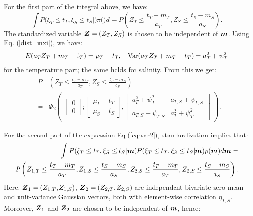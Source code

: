 \documentclass[aoas]{imsart}
\begin{document}
For the first part of the integral above, we have:
\begin{equation}
\label{part1:phi2}
 \int P(\xi_T \leq t_T, \xi_S \leq t_S|\bm) \pi(\bm) d\bm= 
P \left( Z_{T} \leq \frac{t_T-m_{T}}{a_{T}}, 
Z_{S} \leq \frac{t_S-m_{S}}{a_{S}} \right). \nonumber
\end{equation}
The standardized variable ${\boldsymbol Z}=(Z_{T},Z_{S})$ is chosen to be independent of ${\boldsymbol m}$. Using Eq. (\ref{dist_mxi}), we have:
\begin{equation}
    E(a_{T} Z_{T}+m_{T}-t_T) = \mu_{T}-t_T, \hspace{3mm}
    \mbox{Var}(a_{T} Z_{T}+m_{T}-t_T) = a^2_T+ \psi^2_{T} 
\end{equation}
for the temperature part; the same holds for salinity. From this we
get:
\begin{eqnarray}\label{two_parts0}
& P & \left( Z_{T} \leq \frac{t_T-m_{T}}{a_{T}}, 
Z_{S} \leq \frac{t_S-m_{S}}{a_{S}} \right) \\
&=& \Phi_2 \begin{pmatrix} 
\begin{bmatrix} 0\\
0
\end{bmatrix};
\begin{bmatrix} \mu_{T}-t_T\\
\mu_{S}-t_S
\end{bmatrix},\begin{bmatrix}
a^2_T+ \psi^2_{T} & a_{T,S}+\psi_{T,S}  \\
a_{T,S}+\psi_{T,S}   & a^2_T+ \psi^2_{T} 
\end{bmatrix}\end{pmatrix} \nonumber.
\end{eqnarray}

For the second part of the expression Eq.(\ref{eq:var2}), standardization
implies that: 
\begin{eqnarray}\label{part1:phi4}
&& \hspace{6mm} \int P(\xi_T \leq t_T, \xi_S \leq t_S|\bm) P(\xi_T \leq t_T, \xi_S \leq t_S|\bm) p(\bm) d\bm =  \\
&P& \hspace{-3mm} \left( Z_{1,T} \leq \frac{t_T-m_{T}}{a_{T}}, 
Z_{1,S} \leq \frac{t_S-m_{S}}{a_{S}},Z_{2,S} \leq \frac{t_T-m_{T}}{a_{T}}, 
Z_{2,S} \leq \frac{t_S-m_{S}}{a_{S}} \right). \nonumber
\end{eqnarray}
Here, ${\boldsymbol Z}_1=(Z_{1,T},Z_{1,S})$, ${\boldsymbol Z}_2=(Z_{2,T},Z_{2,S})$ are
independent bivariate zero-mean and unit-variance Gaussian vectors,
both with element-wise correlation $\eta_{T,S}$. Moreover, ${\boldsymbol Z}_1$ and
${\boldsymbol Z}_2$ are chosen to be independent of ${\boldsymbol m}$, hence:
\end{document}
